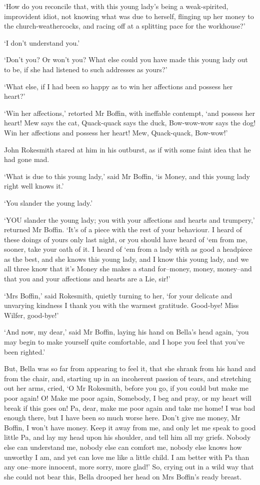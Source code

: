 ‘How do you reconcile that, with this young lady’s being a
weak-spirited, improvident idiot, not knowing what was due to herself,
flinging up her money to the church-weathercocks, and racing off at a
splitting pace for the workhouse?’

‘I don’t understand you.’

‘Don’t you? Or won’t you? What else could you have made this young lady
out to be, if she had listened to such addresses as yours?’

‘What else, if I had been so happy as to win her affections and possess
her heart?’

‘Win her affections,’ retorted Mr Boffin, with ineffable contempt,
‘and possess her heart! Mew says the cat, Quack-quack says the duck,
Bow-wow-wow says the dog! Win her affections and possess her heart! Mew,
Quack-quack, Bow-wow!’

John Rokesmith stared at him in his outburst, as if with some faint idea
that he had gone mad.

‘What is due to this young lady,’ said Mr Boffin, ‘is Money, and this
young lady right well knows it.’

‘You slander the young lady.’

‘YOU slander the young lady; you with your affections and hearts and
trumpery,’ returned Mr Boffin. ‘It’s of a piece with the rest of your
behaviour. I heard of these doings of yours only last night, or you
should have heard of ‘em from me, sooner, take your oath of it. I heard
of ‘em from a lady with as good a headpiece as the best, and she knows
this young lady, and I know this young lady, and we all three know that
it’s Money she makes a stand for--money, money, money--and that you and
your affections and hearts are a Lie, sir!’

‘Mrs Boffin,’ said Rokesmith, quietly turning to her, ‘for your delicate
and unvarying kindness I thank you with the warmest gratitude. Good-bye!
Miss Wilfer, good-bye!’

‘And now, my dear,’ said Mr Boffin, laying his hand on Bella’s head
again, ‘you may begin to make yourself quite comfortable, and I hope you
feel that you’ve been righted.’

But, Bella was so far from appearing to feel it, that she shrank from
his hand and from the chair, and, starting up in an incoherent passion
of tears, and stretching out her arms, cried, ‘O Mr Rokesmith, before
you go, if you could but make me poor again! O! Make me poor again,
Somebody, I beg and pray, or my heart will break if this goes on! Pa,
dear, make me poor again and take me home! I was bad enough there, but
I have been so much worse here. Don’t give me money, Mr Boffin, I won’t
have money. Keep it away from me, and only let me speak to good little
Pa, and lay my head upon his shoulder, and tell him all my griefs.
Nobody else can understand me, nobody else can comfort me, nobody else
knows how unworthy I am, and yet can love me like a little child. I am
better with Pa than any one--more innocent, more sorry, more glad!’ So,
crying out in a wild way that she could not bear this, Bella drooped her
head on Mrs Boffin’s ready breast.

